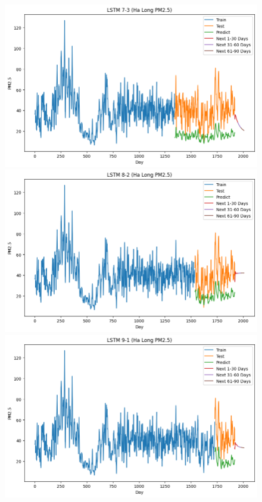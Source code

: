 \begin{figure}[H]
{\begin{adjustbox}{minipage=0.48\textwidth}
            \centering
            \begin{minipage}{0.3\textwidth}
                \centering
                \includegraphics[width=\textwidth, height=0.6\textwidth]{img/final/LSTM/90D/LSTM_7_3_HL.png}\\
                \includegraphics[width=\textwidth, height=0.6\textwidth]{img/final/LSTM/90D/LSTM_8_2_HL.png}\\
                \includegraphics[width=\textwidth, height=0.6\textwidth]{img/final/LSTM/90D/LSTM_9_1_HL.png}

\end{minipage}
\end{adjustbox}}
\end{figure}
